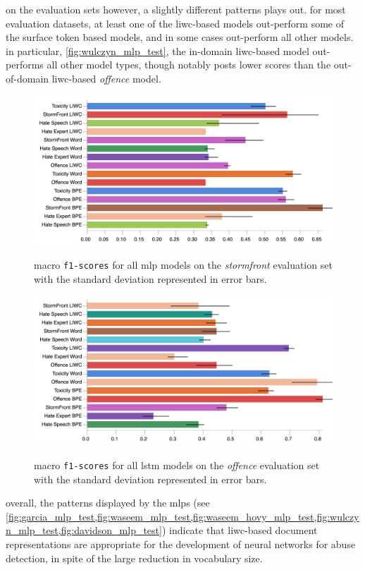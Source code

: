 on the evaluation sets however, a slightly different patterns plays out. 
for most evaluation datasets, at least one of the liwc-based models out-perform some of the surface token based models, and in some cases out-perform all other models.
in particular, \cref{fig:wulczyn_mlp_test}, the in-domain liwc-based model out-performs all other model types, though notably posts lower scores than the out-of-domain liwc-based \textit{offence} model.

\begin{figure}
\begin{minipage}{\textwidth}
\centering
  \includegraphics[width=\textwidth]{all_mlp_garcia_test.pdf}
  \caption{macro \texttt{f1-scores} for all mlp models on the \textit{stormfront} evaluation set with the standard deviation represented in error bars.}
  \label{fig:garcia_mlp_test}
  \vfill
    \includegraphics[width=\textwidth]{all_lstm_davidson_test.pdf}
    \caption{macro \texttt{f1-scores} for all lstm models on the \textit{offence} evaluation set with the standard deviation represented in error bars.}
    \label{fig:davidson_lstm_test}
  \end{minipage}
\end{figure}

overall, the patterns displayed by the mlps (see \cref{fig:garcia_mlp_test,fig:waseem_mlp_test,fig:waseem_hovy_mlp_test,fig:wulczyn_mlp_test,fig:davidson_mlp_test}) indicate that liwc-based document representations are appropriate for the development of neural networks for abuse detection, in spite of the large reduction in vocabulary size.

